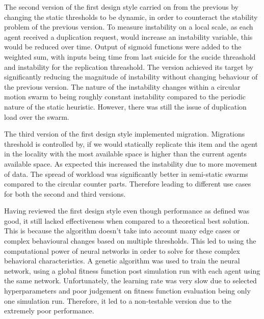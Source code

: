 \documentclass{UoYCSproject}
\begin{document}
\begin{summary}
The second version of the first design style carried on from the previous by changing the static thresholds to be dynamic, in order to counteract the stability problem of the previous version. To measure instability on a local scale, as each agent received a duplication request, would increase an instability variable, this would be reduced over time. Output of sigmoid functions were added to the weighted sum, with inputs being time from last suicide for the sucide threashold and instability for the replication threashold. The version achieved its target by significantly reducing the magnitude of instability without changing behaviour of the previous version. The nature of the instability changes within a circular motion swarm to being roughly constant instability compared to the periodic nature of the static heuristic. However, there was still the issue of duplication load over the swarm.

The third version of the first design style implemented migration. Migrations threshold is controlled by, if we would statically replicate this item and the agent in the locality with the most available space is higher than the current agents available space. As expected this increased the instability due to more movement of data. The spread of workload was significantly better in semi-static swarms compared to the circular counter parts. Therefore leading to different use cases for both the second and third versions.


Having reviewed the first design style even though performance as defined was good, it still lacked effectiveness when compared to a theoretical best solution. This is because the algorithm doesn’t take into account many edge cases or complex behavioural changes based on multiple thresholds. This led to using the computational power of neural networks in order to solve for these complex behavioral characteristics. A genetic algorithm was used to train the neural network, using a global fitness function post simulation run with each agent using the same network. Unfortunately, the learning rate was very slow due to selected hyperparameters and poor judgement on fitness function evaluation being only one simulation run. Therefore, it led to a non-testable version due to the extremely poor performance.


\end{summary}
\end{document}
